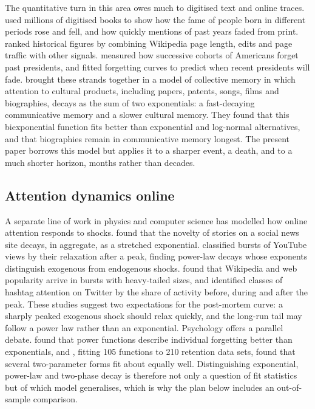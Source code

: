 \documentclass[11pt,a4paper]{article}
\begin{document}
The quantitative turn in this area owes much to digitised text and online traces. \citet{michel2011} used millions of digitised books to show how the fame of people born in different periods rose and fell, and how quickly mentions of past years faded from print. \citet{skiena2013} ranked historical figures by combining Wikipedia page length, edits and page traffic with other signals. \citet{roediger2014} measured how successive cohorts of Americans forget past presidents, and fitted forgetting curves to predict when recent presidents will fade. \citet{candia2019} brought these strands together in a model of collective memory in which attention to cultural products, including papers, patents, songs, films and biographies, decays as the sum of two exponentials: a fast-decaying communicative memory and a slower cultural memory. They found that this biexponential function fits better than exponential and log-normal alternatives, and that biographies remain in communicative memory longest. The present paper borrows this model but applies it to a sharper event, a death, and to a much shorter horizon, months rather than decades.

\subsection{Attention dynamics online}
A separate line of work in physics and computer science has modelled how online attention responds to shocks. \citet{wu2007} found that the novelty of stories on a social news site decays, in aggregate, as a stretched exponential. \citet{crane2008} classified bursts of YouTube views by their relaxation after a peak, finding power-law decays whose exponents distinguish exogenous from endogenous shocks. \citet{ratkiewicz2010} found that Wikipedia and web popularity arrive in bursts with heavy-tailed sizes, and \citet{lehmann2012} identified classes of hashtag attention on Twitter by the share of activity before, during and after the peak. These studies suggest two expectations for the post-mortem curve: a sharply peaked exogenous shock should relax quickly, and the long-run tail may follow a power law rather than an exponential. Psychology offers a parallel debate. \citet{wixted1991} found that power functions describe individual forgetting better than exponentials, and \citet{rubin1996}, fitting 105 functions to 210 retention data sets, found that several two-parameter forms fit about equally well. Distinguishing exponential, power-law and two-phase decay is therefore not only a question of fit statistics but of which model generalises, which is why the plan below includes an out-of-sample comparison.
\end{document}
